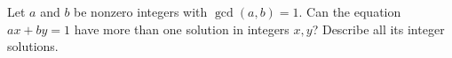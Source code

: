 Let $a$ and $b$ be nonzero integers with $\gcd(a,b)=1$. Can the equation $ax+by=1$ have more than one solution in integers $x,y$? Describe all its integer solutions.
